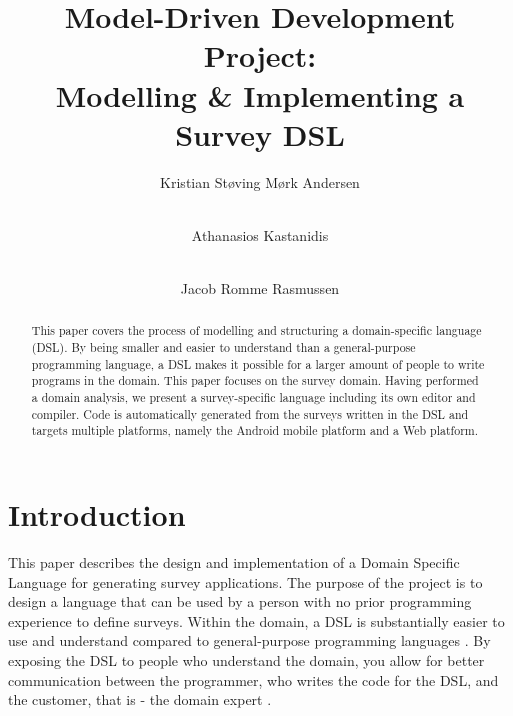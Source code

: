 \documentclass[runningheads]{llncs}
\begin{document}
\mainmatter  %

\title{Model-Driven Development Project:\\ Modelling \& Implementing a Survey DSL}


\author{Kristian Støving Mørk Andersen \and \\ Athanasios Kastanidis \and \\ Jacob Romme Rasmussen}
%

\institute{\mailsa\\}

\maketitle


\begin{abstract}
This paper covers the process of modelling and structuring a domain-specific language (DSL). By being smaller and easier to understand than a general-purpose programming language, a DSL makes it possible for a larger amount of people to write programs in the domain. This paper focuses on the survey domain. Having performed a domain analysis, we present a survey-specific language including its own editor and compiler. Code is automatically generated from the surveys written in the DSL and targets multiple platforms, namely the Android mobile platform and a Web platform. 
\end{abstract}

\section{Introduction}
This paper describes the design and implementation of a Domain Specific Language for generating survey applications. The purpose of the project is to design a language that can be used by a person with no prior programming experience to define surveys. Within the domain, a DSL is substantially easier to use and understand compared to general-purpose programming languages \cite{mernik}. By exposing the DSL to people who understand the domain, you allow for better communication between the programmer, who writes the code for the DSL, and the customer, that is - the domain expert \cite{fowler}. 
\end{document}
